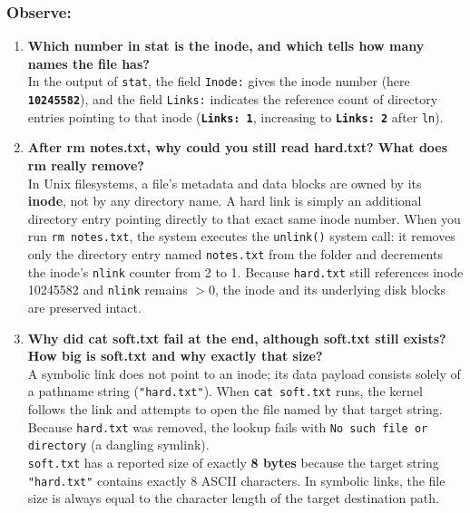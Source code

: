 \documentclass{labreport}
\begin{document}
\subsubsection*{Observe:}
\begin{enumerate}[leftmargin=*]
    \item \textbf{Which number in stat is the inode, and which tells how many names the file has?}\\[0.2em]
    In the output of \texttt{stat}, the field \texttt{Inode:} gives the inode number (here \textbf{\texttt{10245582}}), and the field \texttt{Links:} indicates the reference count of directory entries pointing to that inode (\textbf{\texttt{Links: 1}}, increasing to \textbf{\texttt{Links: 2}} after \texttt{ln}).

    \item \textbf{After rm notes.txt, why could you still read hard.txt? What does rm really remove?}\\[0.2em]
    In Unix filesystems, a file's metadata and data blocks are owned by its \textbf{inode}, not by any directory name. A hard link is simply an additional directory entry pointing directly to that exact same inode number. When you run \texttt{rm notes.txt}, the system executes the \texttt{unlink()} system call: it removes only the directory entry named \texttt{notes.txt} from the folder and decrements the inode's \texttt{nlink} counter from 2 to 1. Because \texttt{hard.txt} still references inode 10245582 and \texttt{nlink} remains $> 0$, the inode and its underlying disk blocks are preserved intact.

    \item \textbf{Why did cat soft.txt fail at the end, although soft.txt still exists? How big is soft.txt and why exactly that size?}\\[0.2em]
    A symbolic link does not point to an inode; its data payload consists solely of a pathname string (\texttt{"hard.txt"}). When \texttt{cat soft.txt} runs, the kernel follows the link and attempts to open the file named by that target string. Because \texttt{hard.txt} was removed, the lookup fails with \texttt{No such file or directory} (a dangling symlink).\\
    \texttt{soft.txt} has a reported size of exactly \textbf{8 bytes} because the target string \texttt{"hard.txt"} contains exactly 8 ASCII characters. In symbolic links, the file size is always equal to the character length of the target destination path.


\end{enumerate}
\end{document}
